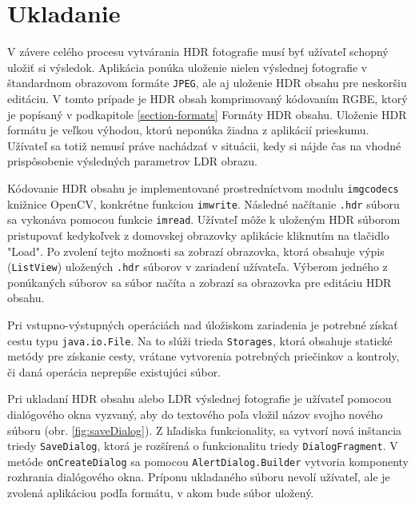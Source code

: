 \section{Ukladanie}

V závere celého procesu vytvárania HDR fotografie musí byť užívateľ schopný uložiť si výsledok. Aplikácia ponúka
uloženie nielen výslednej fotografie v štandardnom obrazovom formáte \texttt{JPEG}, ale aj uloženie HDR obsahu 
pre neskoršiu editáciu. V tomto prípade je HDR obsah komprimovaný kódovaním RGBE, ktorý je popísaný v podkapitole
\ref{section-formats} Formáty HDR obsahu. Uloženie HDR formátu je veľkou výhodou, ktorú neponúka žiadna z aplikácií
prieskumu. Užívateľ sa totiž nemusí práve nachádzať v situácii, kedy si nájde čas na vhodné prispôsobenie výsledných
parametrov LDR obrazu.

Kódovanie HDR obsahu je implementované prostredníctvom modulu \texttt{imgcodecs} knižnice OpenCV, konkrétne funkciou
\texttt{imwrite}. Následné načítanie \texttt{.hdr} súboru sa vykonáva pomocou funkcie \texttt{imread}.
Užívateľ môže k uloženým HDR súborom pristupovať kedykoľvek z domovskej obrazovky aplikácie kliknutím na tlačidlo
"Load". Po zvolení tejto možnosti sa zobrazí obrazovka, ktorá obsahuje výpis (\texttt{ListView}) uložených
\texttt{.hdr} súborov v zariadení užívateľa. Výberom jedného z ponúkaných súborov sa súbor načíta a zobrazí 
sa obrazovka pre editáciu HDR obsahu.

Pri vstupno-výstupných operáciách nad úložiskom zariadenia je potrebné získať cestu typu \texttt{java.io.File}.
Na to slúži trieda \texttt{Storages}, ktorá obsahuje statické metódy pre získanie cesty, vrátane vytvorenia
potrebných priečinkov a kontroly, či daná operácia neprepíše existujúci súbor.

Pri ukladaní HDR obsahu alebo LDR výslednej fotografie je užívateľ pomocou dialógového okna vyzvaný, aby do textového
poľa vložil názov svojho nového súboru (obr. \ref{fig:saveDialog}). Z hľadiska funkcionality, sa vytvorí nová inštancia
triedy \texttt{SaveDialog}, ktorá je rozšírená o funkcionalitu triedy \texttt{DialogFragment}. V metóde \texttt{onCreateDialog}
sa pomocou \texttt{AlertDialog.Builder} vytvoria komponenty rozhrania dialógového okna. Príponu ukladaného súboru nevolí
užívateľ, ale je zvolená aplikáciou podľa formátu, v akom bude súbor uložený.

